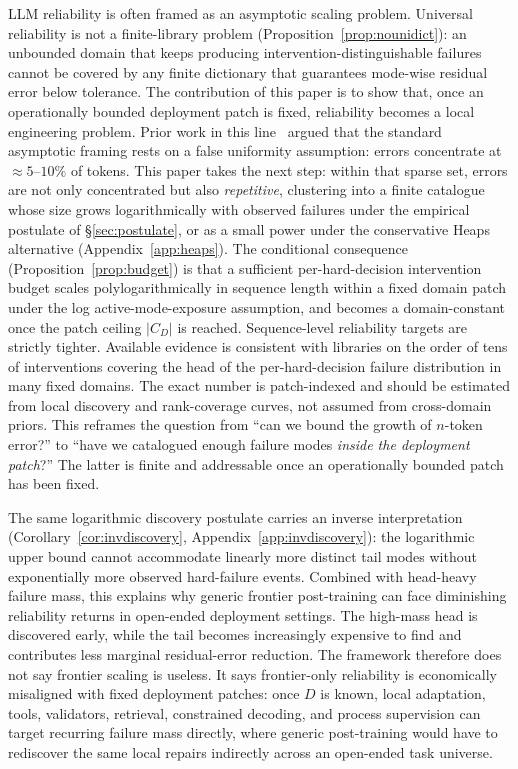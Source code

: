 \documentclass{article}
\theoremstyle{taeplain}
\theoremstyle{taedefn}
\newcommand{\teApprox}{\ensuremath{\approx}}
\begin{document}
LLM reliability is often framed as an asymptotic scaling problem. Universal reliability is not a finite-library problem (Proposition~\ref{prop:nounidict}): an unbounded domain that keeps producing intervention-distinguishable failures cannot be covered by any finite dictionary that guarantees mode-wise residual error below tolerance. The contribution of this paper is to show that, once an operationally bounded deployment patch is fixed, reliability becomes a local engineering problem. Prior work in this line~\citep{arbuzov2025beyond} argued that the standard asymptotic framing rests on a false uniformity assumption: errors concentrate at $\teApprox 5$--$10\%$ of tokens. This paper takes the next step: within that sparse set, errors are not only concentrated but also \emph{repetitive}, clustering into a finite catalogue whose size grows logarithmically with observed failures under the empirical postulate of \S\ref{sec:postulate}, or as a small power under the conservative Heaps alternative (Appendix~\ref{app:heaps}). The conditional consequence (Proposition~\ref{prop:budget}) is that a sufficient per-hard-decision intervention budget scales polylogarithmically in sequence length within a fixed domain patch under the log active-mode-exposure assumption, and becomes a domain-constant once the patch ceiling $|C_D|$ is reached. Sequence-level reliability targets are strictly tighter. Available evidence is consistent with libraries on the order of tens of interventions covering the head of the per-hard-decision failure distribution in many fixed domains. The exact number is patch-indexed and should be estimated from local discovery and rank-coverage curves, not assumed from cross-domain priors. This reframes the question from ``can we bound the growth of $n$-token error?'' to ``have we catalogued enough failure modes \emph{inside the deployment patch}?'' The latter is finite and addressable once an operationally bounded patch has been fixed.

The same logarithmic discovery postulate carries an inverse interpretation (Corollary~\ref{cor:invdiscovery}, Appendix~\ref{app:invdiscovery}): the logarithmic upper bound cannot accommodate linearly more distinct tail modes without exponentially more observed hard-failure events. Combined with head-heavy failure mass, this explains why generic frontier post-training can face diminishing reliability returns in open-ended deployment settings. The high-mass head is discovered early, while the tail becomes increasingly expensive to find and contributes less marginal residual-error reduction. The framework therefore does not say frontier scaling is useless. It says frontier-only reliability is economically misaligned with fixed deployment patches: once $D$ is known, local adaptation, tools, validators, retrieval, constrained decoding, and process supervision can target recurring failure mass directly, where generic post-training would have to rediscover the same local repairs indirectly across an open-ended task universe.
\end{document}

